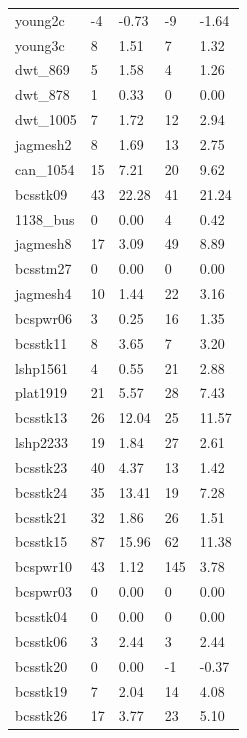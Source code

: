 \begin{table}[h!]
{\begin{tabular}{lllll}
            young2c & -4 & -0.73 & -9 & -1.64 \\
            young3c & 8 & 1.51 & 7 & 1.32 \\
            dwt\_869 & 5 & 1.58 & 4 & 1.26 \\
            dwt\_878 & 1 & 0.33 & 0 & 0.00 \\
            dwt\_1005 & 7 & 1.72 & 12 & 2.94 \\
            jagmesh2 & 8 & 1.69 & 13 & 2.75 \\
            can\_1054 & 15 & 7.21 & 20 & 9.62 \\
            bcsstk09 & 43 & 22.28 & 41 & 21.24 \\
            1138\_bus & 0 & 0.00 & 4 & 0.42 \\
            jagmesh8 & 17 & 3.09 & 49 & 8.89 \\
            bcsstm27 & 0 & 0.00 & 0 & 0.00 \\
            jagmesh4 & 10 & 1.44 & 22 & 3.16 \\
            bcspwr06 & 3 & 0.25 & 16 & 1.35 \\
            bcsstk11 & 8 & 3.65 & 7 & 3.20 \\
            lshp1561 & 4 & 0.55 & 21 & 2.88 \\
            plat1919 & 21 & 5.57 & 28 & 7.43 \\
            bcsstk13 & 26 & 12.04 & 25 & 11.57 \\
            lshp2233 & 19 & 1.84 & 27 & 2.61 \\
            bcsstk23 & 40 & 4.37 & 13 & 1.42 \\
            bcsstk24 & 35 & 13.41 & 19 & 7.28 \\
            bcsstk21 & 32 & 1.86 & 26 & 1.51 \\
            bcsstk15 & 87 & 15.96 & 62 & 11.38 \\
            bcspwr10 & 43 & 1.12 & 145 & 3.78 \\
            bcspwr03 & 0 & 0.00 & 0 & 0.00 \\
            bcsstk04 & 0 & 0.00 & 0 & 0.00 \\
            bcsstk06 & 3 & 2.44 & 3 & 2.44 \\
            bcsstk20 & 0 & 0.00 & -1 & -0.37 \\
            bcsstk19 & 7 & 2.04 & 14 & 4.08 \\
            bcsstk26 & 17 & 3.77 & 23 & 5.10 \\
            \bottomrule
        \end{tabular}
    }{
}
\end{table}
